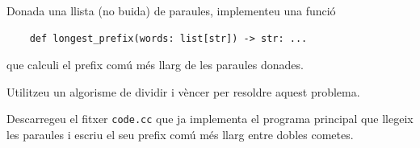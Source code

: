 
\UsePython

\Statement

Donada una llista (no buida) de paraules, implementeu una funció

\begin{lstlisting}
    def longest_prefix(words: list[str]) -> str: ...
\end{lstlisting}

que calculi el prefix comú més llarg de les paraules donades.

\medskip

Utilitzeu un algorisme de dividir i vèncer per resoldre aquest problema.

\medskip

Descarregeu el fitxer \texttt{code.cc} que ja implementa el programa principal que llegeix les paraules i escriu el seu prefix comú més llarg entre dobles cometes.

\Sample
